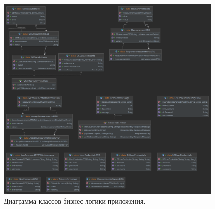 \begin{figure}[hbtp]
	\centering
	\includegraphics[width=\textwidth]{img/domainLayerDiagram.png}
	\caption{Диаграмма классов бизнес-логики приложения. }
	\label{fig:domainLayer}
\end{figure}

